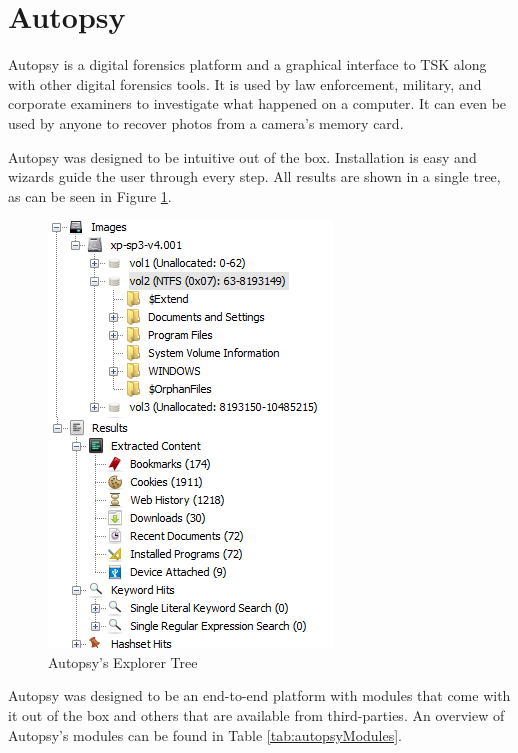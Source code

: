 \section{Autopsy}

Autopsy is a digital forensics platform and a graphical interface to TSK
along with other digital forensics tools. It is used by law enforcement, military, 
and corporate examiners to investigate what happened on a computer. It can even 
be used by anyone to recover photos from a camera's memory card.

Autopsy was designed to be intuitive out of the box. Installation is easy and
wizards guide the user through every step. All results are shown in a single tree, as can be seen in Figure \ref{fig:tree}.

\begin{figure}[ht]
 \centering
 \includegraphics[width=0.5\linewidth]{imgs/tree.png}
 \caption{Autopsy's Explorer Tree}
 \label{fig:tree}
\end{figure}

Autopsy was designed to be an end-to-end platform with modules that come with
it out of the box and others that are available from third-parties. An overview of Autopsy's modules can be found in Table \ref{tab:autopsyModules}.

